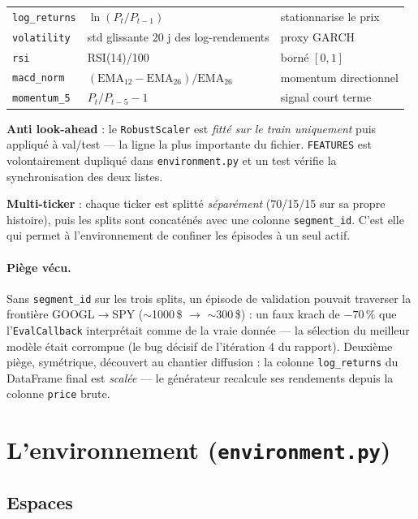 \documentclass[11pt,a4paper]{article}
\newcommand{\code}[1]{\texttt{#1}}
\newcommand{\piege}[1]{\paragraph{\textcolor{red!70!black}{Piège vécu.}} #1}
\begin{document}
\begin{center}\small
\begin{tabular}{@{}lll@{}}
\toprule
\code{log\_returns} & $\ln(P_t/P_{t-1})$ & stationnarise le prix \\
\code{volatility} & std glissante 20 j des log-rendements & proxy GARCH \\
\code{rsi} & RSI(14)/100 & borné $[0,1]$ \\
\code{macd\_norm} & $(\mathrm{EMA}_{12}-\mathrm{EMA}_{26})/\mathrm{EMA}_{26}$ & momentum directionnel \\
\code{momentum\_5} & $P_t/P_{t-5}-1$ & signal court terme \\
\bottomrule
\end{tabular}
\end{center}

\textbf{Anti look-ahead} : le \code{RobustScaler} est \emph{fitté sur le train
uniquement} puis appliqué à val/test --- la ligne la plus importante du
fichier. \code{FEATURES} est volontairement dupliqué dans
\code{environment.py} et un test vérifie la synchronisation des deux listes.

\textbf{Multi-ticker} : chaque ticker est splitté \emph{séparément} (70/15/15
sur sa propre histoire), puis les splits sont concaténés avec une colonne
\code{segment\_id}. C'est elle qui permet à l'environnement de confiner les
épisodes à un seul actif.

\piege{Sans \code{segment\_id} sur les trois splits, un épisode de validation
pouvait traverser la frontière GOOGL$\to$SPY ($\sim$1000\,\$ $\to$
$\sim$300\,\$) : un faux krach de $-70\,\%$ que l'\code{EvalCallback}
interprétait comme de la vraie donnée --- la sélection du meilleur modèle
était corrompue (le bug décisif de l'itération 4 du rapport). Deuxième piège,
symétrique, découvert au chantier diffusion : la colonne \code{log\_returns}
du DataFrame final est \emph{scalée} --- le générateur recalcule ses
rendements depuis la colonne \code{price} brute.}

\section{L'environnement (\code{environment.py})}

\subsection{Espaces}
\end{document}
